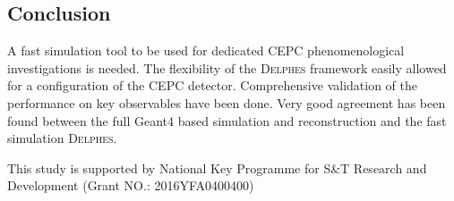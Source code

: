 \documentclass[a4paper,10pt,twoside]{cpc-hepnp}
\begin{document}
\begin{multicols}{2}
\section{Conclusion\label{sec:conclusion}}

A fast simulation tool to be used for dedicated CEPC phenomenological investigations is needed. 
The flexibility of the {\textsc{Delphes}} framework easily allowed for a configuration of the CEPC detector. 
Comprehensive validation of the performance on key observables have been done. 
Very good agreement has been found between the full Geant4 based simulation and reconstruction and the fast simulation {\textsc{Delphes}}. 

This study is supported by National Key Programme for S\&T Research and Development (Grant NO.: 2016YFA0400400)

\vspace{3mm}

\begin{thebibliography}{90}

\vspace{3mm}


\end{thebibliography}
\end{multicols}
\end{document}
